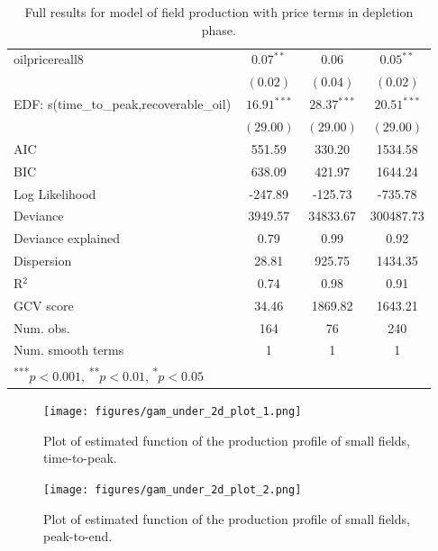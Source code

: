 \documentclass[11pt]{article}
\begin{document}
\begin{spacing}{1}
\begin{table}
\begin{center}
\begin{tabular}{l c c c }
oilpricereall8                    & $0.07^{**}$   & $0.06$        & $0.05^{**}$   \\
                                     & $(0.02)$      & $(0.04)$      & $(0.02)$      \\
EDF: s(time_to_peak,recoverable_oil) & $16.91^{***}$ & $28.37^{***}$ & $20.51^{***}$ \\
                                     & $(29.00)$     & $(29.00)$     & $(29.00)$     \\
\hline
AIC                                  & 551.59        & 330.20        & 1534.58       \\
BIC                                  & 638.09        & 421.97        & 1644.24       \\
Log Likelihood                       & -247.89       & -125.73       & -735.78       \\
Deviance                             & 3949.57       & 34833.67      & 300487.73     \\
Deviance explained                   & 0.79          & 0.99          & 0.92          \\
Dispersion                           & 28.81         & 925.75        & 1434.35       \\
R$^2$                                & 0.74          & 0.98          & 0.91          \\
GCV score                            & 34.46         & 1869.82       & 1643.21       \\
Num. obs.                            & 164           & 76            & 240           \\
Num. smooth terms                    & 1             & 1             & 1             \\
\hline
\multicolumn{4}{l}{\scriptsize{\textsuperscript{***}$p<0.001$, 
  \textsuperscript{**}$p<0.01$, 
  \textsuperscript{*}$p<0.05$}}
\end{tabular}
\caption{Full results for model of field production with price terms in depletion phase.}
\label{table:prepeak}
\end{center}
\end{table}


\begin{figure}
	\texttt{[image: figures/gam\_under\_2d\_plot\_1.png]}
	\caption{Plot of estimated function of the production profile of small fields, time-to-peak.}
	\label{chart:gam_under_2d_plot_1}
\end{figure}

\begin{figure}
	\texttt{[image: figures/gam\_under\_2d\_plot\_2.png]}
	\caption{Plot of estimated function of the production profile of small fields, peak-to-end.}
	\label{chart:gam_under_2d_plot_2}
\end{figure}


\end{spacing}
\end{document}

